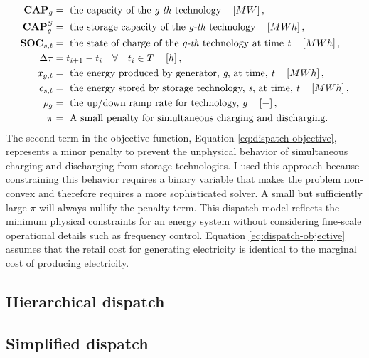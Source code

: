 \begin{align}
    \textbf{CAP}_g &= \text{ the capacity of the \textit{g-th} technology}\quad \left[MW\right],\nonumber\\
    \textbf{CAP}^S_g &= \text{ the storage capacity of the \textit{g-th} technology}\quad \left[MWh\right],\nonumber\\
    \textbf{SOC}_{s,t} &= \text{ the state of charge of the \textit{g-th} technology at time \textit{t}}\quad \left[MWh\right]\nonumber,\\
    \Delta\tau &= t_{i+1} - t_i \quad \forall \quad t_i \in T \quad \left[h\right],\nonumber\\
    x_{g,t} &= \text{ the energy produced by generator, \textit{g}, at time, \textit{t}}\quad \left[MWh\right]\nonumber,\\
    c_{s,t} &= \text{ the energy stored by storage technology, \textit{s}, at time, \textit{t}}\quad \left[MWh\right]\nonumber,\\
    \rho_g &= \text{ the up/down ramp rate for technology, \textit{g}} \quad \left[-\right]\nonumber,\\
    \pi &= \text{ A small penalty for simultaneous charging and discharging.}\nonumber
\end{align}
The second term in the objective function, Equation \ref{eq:dispatch-objective},
represents a minor penalty to prevent the unphysical behavior of simultaneous
charging and discharging from storage technologies. I used this approach because
constraining this behavior requires a binary variable that makes the problem
non-convex and therefore requires a more sophisticated solver. A small but
sufficiently large $\pi$ will always nullify the penalty term. This dispatch
model reflects the minimum physical constraints for an energy system without
considering fine-scale operational details such as frequency control. Equation
\ref{eq:dispatch-objective} assumes that the retail cost for generating
electricity is identical to the marginal cost of producing electricity. 

\subsection{Hierarchical dispatch}

\subsection{Simplified dispatch}